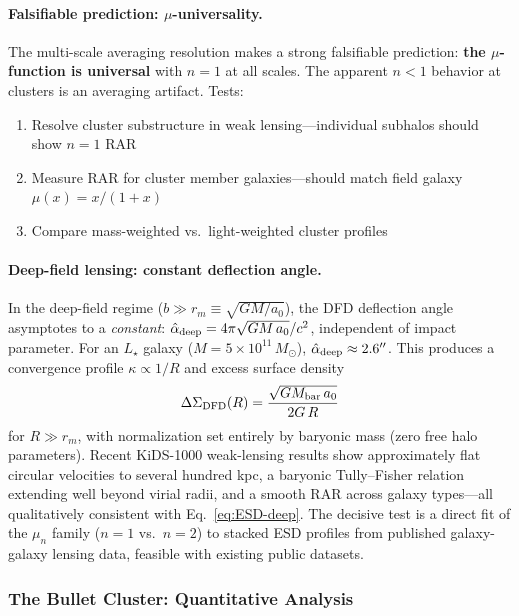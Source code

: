 \paragraph{Falsifiable prediction: $\mu$-universality.}
The multi-scale averaging resolution makes a strong falsifiable prediction: \textbf{the $\mu$-function is universal} with $n = 1$ at all scales. The apparent $n < 1$ behavior at clusters is an averaging artifact. Tests:
\begin{enumerate}
\item Resolve cluster substructure in weak lensing---individual subhalos should show $n = 1$ RAR
\item Measure RAR for cluster member galaxies---should match field galaxy $\mu(x) = x/(1+x)$
\item Compare mass-weighted vs.\ light-weighted cluster profiles
\end{enumerate}

\paragraph{Deep-field lensing: constant deflection angle.}
In the deep-field regime ($b \gg r_m \equiv \sqrt{GM/a_0}$), the
DFD deflection angle asymptotes to a \emph{constant}:
$\hat{\alpha}_{\rm deep} = 4\pi\sqrt{GM\,a_0}/c^2$, independent of
impact parameter.  For an $L_\star$ galaxy ($M = 5\times10^{11}\,M_\odot$),
$\hat{\alpha}_{\rm deep} \approx 2.6''$.  This produces a convergence
profile $\kappa \propto 1/R$ and excess surface density
\begin{equation}\label{eq:ESD-deep}
\Delta\Sigma_{\rm DFD}(R) = \frac{\sqrt{GM_{\rm bar}\,a_0}}{2G\,R}
\end{equation}
for $R \gg r_m$, with normalization set entirely by baryonic mass (zero
free halo parameters).  Recent KiDS-1000 weak-lensing results show
approximately flat circular velocities to several hundred kpc, a
baryonic Tully--Fisher relation extending well beyond virial radii, and
a smooth RAR across galaxy types---all qualitatively consistent with
Eq.~\eqref{eq:ESD-deep}.  The decisive test is a direct fit of the
$\mu_n$ family ($n = 1$ vs.\ $n = 2$) to stacked ESD profiles from
published galaxy-galaxy lensing data, feasible with existing public
datasets.

\subsubsection{The Bullet Cluster: Quantitative Analysis}

